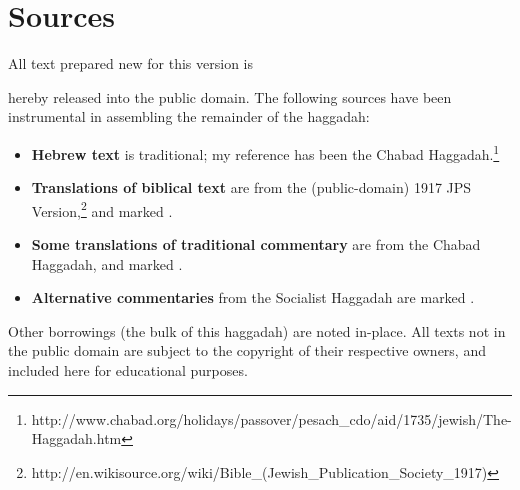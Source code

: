 \documentclass[letter,11pt,openany]{memoir}
\newcommand{\CSrc}{}
\newcommand{\JSrc}{\textsuperscript{\upshape{[J]}}}
\newcommand{\LSrc}{\textsuperscript{\upshape{[L]}}}
\newcommand{\SSrc}{\textsuperscript{\upshape{[S]}}}
\begin{document}


\section*{Sources}

All text prepared new for this version is 

hereby released into the public domain. The following sources have been instrumental in assembling the remainder of the haggadah: 
\begin{itemize}
	\item {\bfseries Hebrew text} is traditional; my reference has been the Chabad Haggadah.\footnote{http://www.chabad.org/holidays/passover/pesach\_cdo/aid/1735/jewish/The-Haggadah.htm} 
	\item {\bfseries Translations of biblical text} are from the (public-domain) 1917 JPS Version,\footnote{http://en.wikisource.org/wiki/Bible\_(Jewish\_Publication\_Society\_1917)} and marked \JSrc. 
	\item {\bfseries Some translations of traditional commentary} are from the Chabad Haggadah, and marked \LSrc. 
	\item {\bfseries Alternative commentaries} from the Socialist Haggadah are marked \SSrc. 
\end{itemize}
Other borrowings (the bulk of this haggadah) are noted in-place. All texts not in the public domain are subject to the copyright of their respective owners, and included here for educational purposes. 
\end{document}
